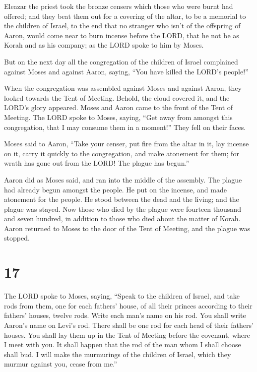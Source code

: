  Eleazar the priest took the bronze censers which those who
were burnt had offered; and they beat them out for a covering of the
altar,  to be a memorial to the children of Israel, to the
end that no stranger who isn't of the offspring of Aaron, would come
near to burn incense before the LORD, that he not be as Korah and as his
company; as the LORD spoke to him by Moses.

 But on the next day all the congregation of the children
of Israel complained against Moses and against Aaron, saying, ``You have
killed the LORD's people!''

 When the congregation was assembled against Moses and
against Aaron, they looked towards the Tent of Meeting. Behold, the
cloud covered it, and the LORD's glory appeared.  Moses and
Aaron came to the front of the Tent of Meeting.  The LORD
spoke to Moses, saying,  ``Get away from amongst this
congregation, that I may consume them in a moment!'' They fell on their
faces.

 Moses said to Aaron, ``Take your censer, put fire from the
altar in it, lay incense on it, carry it quickly to the congregation,
and make atonement for them; for wrath has gone out from the LORD! The
plague has begun.''

 Aaron did as Moses said, and ran into the middle of the
assembly. The plague had already begun amongst the people. He put on the
incense, and made atonement for the people.  He stood
between the dead and the living; and the plague was stayed.
 Now those who died by the plague were fourteen thousand
and seven hundred, in addition to those who died about the matter of
Korah.  Aaron returned to Moses to the door of the Tent of
Meeting, and the plague was stopped.

\hypertarget{section-16}{%
\section{17}\label{section-16}}

 The LORD spoke to Moses, saying,  ``Speak to
the children of Israel, and take rods from them, one for each fathers'
house, of all their princes according to their fathers' houses, twelve
rods. Write each man's name on his rod.  You shall write
Aaron's name on Levi's rod. There shall be one rod for each head of
their fathers' houses.  You shall lay them up in the Tent of
Meeting before the covenant, where I meet with you.  It
shall happen that the rod of the man whom I shall choose shall bud. I
will make the murmurings of the children of Israel, which they murmur
against you, cease from me.''

